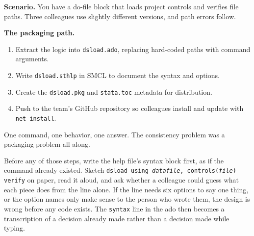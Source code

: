 \begin{appliedexample}\label{ae:ch15-sharedtool}
\textbf{Scenario.} You have a do-file block that loads project controls and verifies file paths. Three colleagues use slightly different versions, and path errors follow.

\medskip
\textbf{The packaging path.}
\begin{enumerate}
    \item Extract the logic into \texttt{dsload.ado}, replacing hard-coded paths with command arguments.
    \item Write \texttt{dsload.sthlp} in SMCL to document the syntax and options.
    \item Create the \texttt{dsload.pkg} and \texttt{stata.toc} metadata for distribution.
    \item Push to the team's GitHub repository so colleagues install and update with \texttt{net install}.
\end{enumerate}
One command, one behavior, one answer. The consistency problem was a packaging problem all along.
\end{appliedexample}

Before any of those steps, write the help file's syntax block first, as if the command already existed. Sketch \texttt{dsload using \textit{datafile}, controls(\textit{file}) verify} on paper, read it aloud, and ask whether a colleague could guess what each piece does from the line alone. If the line needs six options to say one thing, or the option names only make sense to the person who wrote them, the design is wrong before any code exists. The \texttt{syntax} line in the ado then becomes a transcription of a decision already made rather than a decision made while typing.

